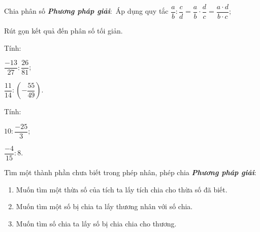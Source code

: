 \begin{dang}{Chia phân số}
	\textbf{\textit{Phương pháp giải}}$\colon$ Áp dụng quy tắc $ \dfrac{a}{b} : \dfrac{c}{d}=\dfrac{a}{b} \cdot \dfrac{d}{c}=\dfrac{a\cdot d}{b \cdot c} $;
	
	Rút gọn kết quả đến phân số tối giản.
\end{dang} 
\setcounter{vd}{0}
\begin{vd}%
	Tính$\colon$
	\begin{enumEX}{2}
		\item $ \dfrac{-13}{27} : \dfrac{26}{81} $;
		\item $\dfrac{11}{14} : \left(-\dfrac{55}{49}\right)$.  
	\end{enumEX}
\end{vd}
\begin{vd}%
	Tính$\colon$
	\begin{enumEX}{2}
		\item  $ 10 : \dfrac{-25}{3} $;
		\item $ \dfrac{-4}{15}:8 $.
	\end{enumEX}
\end{vd}
\begin{dang}{Tìm một thành phần chưa biết trong phép nhân, phép chia}
\textbf{\textit{Phương pháp giải}}$\colon$ \begin{enumerate}
	\item Muốn tìm một thừa số của tích ta lấy tích chia cho thừa số đã biết.
	\item Muốn tìm một số bị chia ta lấy thương nhân với số chia.
	\item Muốn tìm số chia ta lấy số bị chia chia cho thương.
\end{enumerate}
\end{dang} 
